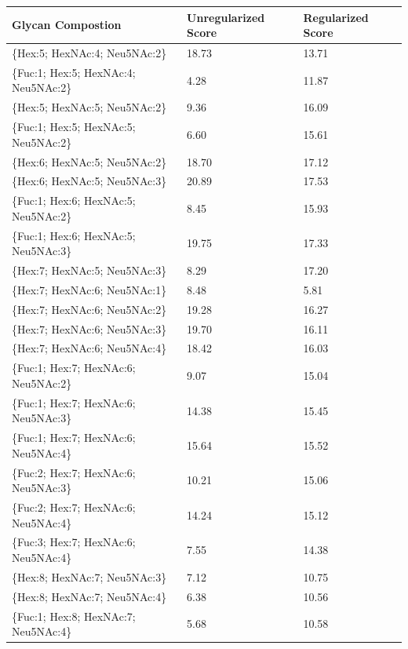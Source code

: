 \begin{table}
\begin{minipage}[t]{0.55\linewidth}
    \begin{footnotesize}
    \begin{tabular}{l|p{2cm} p{2cm}}
Glycan Compostion &  Unregularized Score &  Regularized Score \\
\hline
\{Hex:5; HexNAc:4; Neu5NAc:2\}        &                18.73 &              13.71 \\
\{Fuc:1; Hex:5; HexNAc:4; Neu5NAc:2\} &                 4.28 &              11.87 \\
\{Hex:5; HexNAc:5; Neu5NAc:2\}        &                 9.36 &              16.09 \\
\{Fuc:1; Hex:5; HexNAc:5; Neu5NAc:2\} &                 6.60 &              15.61 \\
\{Hex:6; HexNAc:5; Neu5NAc:2\}        &                18.70 &              17.12 \\
\{Hex:6; HexNAc:5; Neu5NAc:3\}        &                20.89 &              17.53 \\
\{Fuc:1; Hex:6; HexNAc:5; Neu5NAc:2\} &                 8.45 &              15.93 \\
\{Fuc:1; Hex:6; HexNAc:5; Neu5NAc:3\} &                19.75 &              17.33 \\
\{Hex:7; HexNAc:5; Neu5NAc:3\}        &                 8.29 &              17.20 \\
\{Hex:7; HexNAc:6; Neu5NAc:1\}        &                 8.48 &               5.81 \\
\{Hex:7; HexNAc:6; Neu5NAc:2\}        &                19.28 &              16.27 \\
\{Hex:7; HexNAc:6; Neu5NAc:3\}        &                19.70 &              16.11 \\
\{Hex:7; HexNAc:6; Neu5NAc:4\}        &                18.42 &              16.03 \\
\{Fuc:1; Hex:7; HexNAc:6; Neu5NAc:2\} &                 9.07 &              15.04 \\
\{Fuc:1; Hex:7; HexNAc:6; Neu5NAc:3\} &                14.38 &              15.45 \\
\{Fuc:1; Hex:7; HexNAc:6; Neu5NAc:4\} &                15.64 &              15.52 \\
\{Fuc:2; Hex:7; HexNAc:6; Neu5NAc:3\} &                10.21 &              15.06 \\
\{Fuc:2; Hex:7; HexNAc:6; Neu5NAc:4\} &                14.24 &              15.12 \\
\{Fuc:3; Hex:7; HexNAc:6; Neu5NAc:4\} &                 7.55 &              14.38 \\
\{Hex:8; HexNAc:7; Neu5NAc:3\}        &                 7.12 &              10.75 \\
\{Hex:8; HexNAc:7; Neu5NAc:4\}        &                 6.38 &              10.56 \\
\{Fuc:1; Hex:8; HexNAc:7; Neu5NAc:4\} &                 5.68 &              10.58 \\
\end{tabular}


\end{footnotesize}
\end{minipage}
\end{table}

